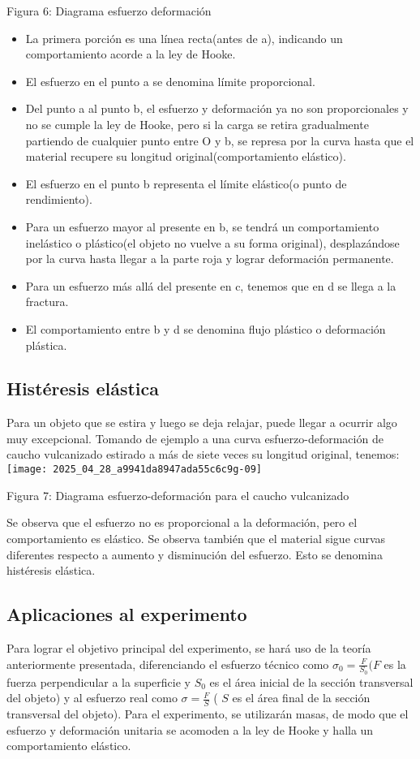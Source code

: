 Figura 6: Diagrama esfuerzo deformación

\begin{itemize}
  \item La primera porción es una línea recta(antes de a), indicando un comportamiento acorde a la ley de Hooke.
  \item El esfuerzo en el punto a se denomina límite proporcional.
  \item Del punto a al punto b, el esfuerzo y deformación ya no son proporcionales y no se cumple la ley de Hooke, pero si la carga se retira gradualmente partiendo de cualquier punto entre O y b, se represa por la curva hasta que el material recupere su longitud original(comportamiento elástico).
  \item El esfuerzo en el punto b representa el límite elástico(o punto de rendimiento).
  \item Para un esfuerzo mayor al presente en b, se tendrá un comportamiento inelástico o plástico(el objeto no vuelve a su forma original), desplazándose por la curva hasta llegar a la parte roja y lograr deformación permanente.
  \item Para un esfuerzo más allá del presente en c, tenemos que en d se llega a la fractura.
  \item El comportamiento entre b y d se denomina flujo plástico o deformación plástica.
\end{itemize}

\subsection{Histéresis elástica}
Para un objeto que se estira y luego se deja relajar, puede llegar a ocurrir algo muy excepcional. Tomando de ejemplo a una curva esfuerzo-deformación de caucho vulcanizado estirado a más de siete veces su longitud original, tenemos:\\
\texttt{[image: 2025\_04\_28\_a9941da8947ada55c6c9g-09]}

Figura 7: Diagrama esfuerzo-deformación para el caucho vulcanizado

Se observa que el esfuerzo no es proporcional a la deformación, pero el comportamiento es elástico. Se observa también que el material sigue curvas diferentes respecto a aumento y disminución del esfuerzo. Esto se denomina histéresis elástica.

\subsection{ Aplicaciones al experimento}
Para lograr el objetivo principal del experimento, se hará uso de la teoría anteriormente presentada, diferenciando el esfuerzo técnico como $\sigma_{0}=\frac{F}{S_{0}}(F$ es la fuerza perpendicular a la superficie y $S_{0}$ es el área inicial de la sección transversal del objeto) y al esfuerzo real como $\sigma=\frac{F}{S}$ ( $S$ es el área final de la sección transversal del objeto). Para el experimento, se utilizarán masas, de modo que el esfuerzo y deformación unitaria se acomoden a la ley de Hooke y halla un comportamiento elástico.

